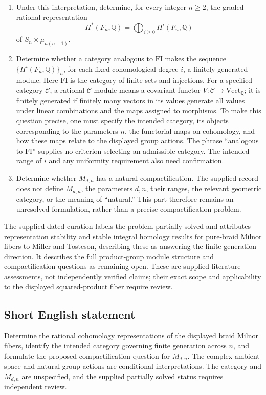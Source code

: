 \documentclass[11pt]{article}
\newcommand{\Q}{\mathbb{Q}}
\begin{document}
\begin{enumerate}
\item Under this interpretation, determine, for every integer \(n\geq2\), the graded rational representation
\[
H^*(F_n,\Q)=\bigoplus_{i\geq0}H^i(F_n,\Q)
\]
of \(S_n\times\mu_{n(n-1)}\).

\item Determine whether a category analogous to \(\mathrm{FI}\) makes the sequence \(\{H^i(F_n,\Q)\}_n\), for each fixed cohomological degree \(i\), a finitely generated module. Here \(\mathrm{FI}\) is the category of finite sets and injections. For a specified category \(\mathcal C\), a rational \(\mathcal C\)-module means a covariant functor \(V:\mathcal C\to\mathrm{Vect}_{\Q}\); it is finitely generated if finitely many vectors in its values generate all values under linear combinations and the maps assigned to morphisms. To make this question precise, one must specify the intended category, its objects corresponding to the parameters \(n\), the functorial maps on cohomology, and how these maps relate to the displayed group actions. The phrase ``analogous to \(\mathrm{FI}\)'' supplies no criterion selecting an admissible category. The intended range of \(i\) and any uniformity requirement also need confirmation.

\item Determine whether \(M_{d,n}\) has a natural compactification. The supplied record does not define \(M_{d,n}\), the parameters \(d,n\), their ranges, the relevant geometric category, or the meaning of ``natural.'' This part therefore remains an unresolved formulation, rather than a precise compactification problem.
\end{enumerate}

The supplied dated curation labels the problem partially solved and attributes representation stability and stable integral homology results for pure-braid Milnor fibers to Miller and Tosteson, describing these as answering the finite-generation direction. It describes the full product-group module structure and compactification questions as remaining open. These are supplied literature assessments, not independently verified claims; their exact scope and applicability to the displayed squared-product fiber require review.
\subsection{Short English statement}
Determine the rational cohomology representations of the displayed braid Milnor fibers, identify the intended category governing finite generation across \(n\), and formulate the proposed compactification question for \(M_{d,n}\). The complex ambient space and natural group actions are conditional interpretations. The category and \(M_{d,n}\) are unspecified, and the supplied partially solved status requires independent review.
\end{document}
